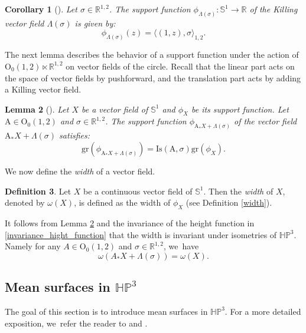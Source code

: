 \documentclass[10pt]{amsart}
\theoremstyle{plain}
\newtheorem{cor}{Corollary}[section]
\newtheorem{lemma}[cor]{Lemma}
\theoremstyle{definition}
\newtheorem{defi}[cor]{Definition}
\newcommand{\minko}{\mathbb{R}^{1,2}}
\newcommand{\HP}{\mathbb{HP}^3}
\newcommand{\inner}[1] {\langle #1 \rangle}
\begin{document}
\begin{cor}[{\cite[Cor.\,2.10]{diaf2023Infearth}}]\label{support_function_of_killing}
Let $\sigma\in \mathbb{R}^{1,2}$. The support function $\phi_{\Lambda(\sigma)}:\mathbb{S}^1\to \mathbb{R}$ of the Killing vector field $\Lambda(\sigma)$ is given by:
\[
\phi_{\Lambda(\sigma)}(z)=\inner{(1,z),\sigma}_{1,2}.
\]
\end{cor}
The next lemma describes the behavior of a support function under the action of $\mathrm{O}_0(1,2)\ltimes\minko$ on vector fields of the circle. Recall that the linear part acts on the space of vector fields by pushforward, and the translation part acts by adding a Killing vector field.

\begin{lemma}[{\cite[Lem.\,2.12]{diaf2023Infearth}}]\label{equii}
Let $X$ be a vector field of $\mathbb{S}^1$ and $\phi_X$ be its support function. Let $\mathrm{A}\in\mathrm{O}_0(1,2)$ and $\sigma\in\minko$. The support function $\phi_{\mathrm{A}_*X+\Lambda(\sigma)}$ of the vector field $\mathrm{A}_*X+\Lambda(\sigma)$ satisfies:\begin{equation}
\mathrm{gr}(\phi_{\mathrm{A}_*X+\Lambda(\sigma)})=\mathrm{Is}(\mathrm{A},\sigma)\mathrm{gr}(\phi_X).
\end{equation}

\end{lemma}
We now define the \emph{width} of a vector field.

\begin{defi}\label{widthX}
Let $X$ be a continuous vector field of $\mathbb{S}^1$. Then the \emph{width} of $X$, denoted by $\omega(X)$, is defined as the width of $\phi_X$ (see Definition \ref{width}).
\end{defi}
It follows from Lemma \ref{equii} and the invariance of the height function in \eqref{invariance_hight_function} that the width is invariant under isometries of $\HP$. Namely for any $A\in \mathrm{O}_{0}(1,2)$ and $\sigma\in\minko$, we~have
\[
\omega(A_*X+\Lambda(\sigma))=\omega(X).
\]

\subsection{Mean surfaces in \texorpdfstring{$\HP$}{HP}}
The goal of this section is to introduce mean surfaces in $\HP$. For a more detailed exposition, we~refer the reader to \cite[\S 5.2-6.3]{fillastreseppi} and \cite[\S 2.3.2]{barbotfillastre}.
\end{document}
